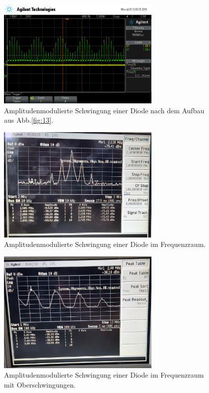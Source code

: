 \begin{figure}
  \centering
  \includegraphics[width=0.7\textwidth]{osci/amp_diode.png}
  \caption{Amplitudenmodulierte
  Schwingung einer Diode nach dem Aufbau aus Abb.\ref{fig:13}.}
  \label{fig:diode_zeit}
\end{figure}


\begin{figure}
  \centering
  \includegraphics[width=0.7\textwidth]{spec/frequenzbereich_klein_diode.jpg}
  \caption{Amplitudenmodulierte
Schwingung einer Diode im Frequenzraum.}
  \label{fig:diode_frequenz_klein}
\end{figure}


\begin{figure}
  \centering
  \includegraphics[width=0.7\textwidth]{spec/frequenzbereich_gross_diode.jpg}
  \caption{Amplitudenmodulierte
Schwingung einer Diode im Frequenzraum mit Oberschwingungen.}
\label{fig:diode_frequenz_gross}
\end{figure}




